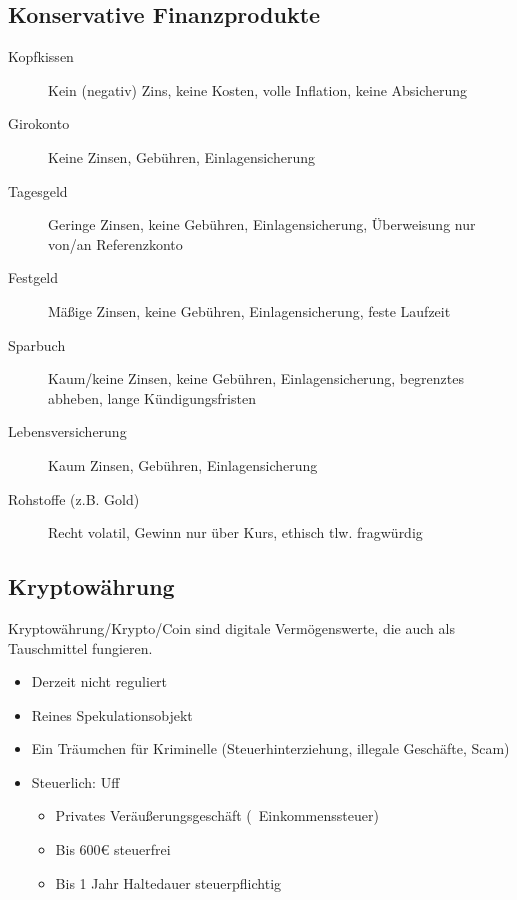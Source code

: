 \documentclass{beamer}
\begin{document}
		\subsection{Konservative Finanzprodukte}
		
			\begin{frame}
				\begin{description}
					\item[Kopfkissen] Kein (negativ) Zins, keine Kosten, volle Inflation, keine Absicherung\pause
					\item[Girokonto] Keine Zinsen, Gebühren, Einlagensicherung\pause
					\item[Tagesgeld] Geringe Zinsen, keine Gebühren, Einlagensicherung, Überweisung nur von/an Referenzkonto\pause
					\item[Festgeld] Mäßige Zinsen, keine Gebühren, Einlagensicherung, feste Laufzeit\pause
					\item[Sparbuch] Kaum/keine Zinsen, keine Gebühren, Einlagensicherung, begrenztes abheben, lange Kündigungsfristen\pause
					\item[Lebensversicherung] Kaum Zinsen, Gebühren, Einlagensicherung\pause
					\item[Rohstoffe (z.B. Gold)] Recht volatil, Gewinn nur über Kurs, ethisch tlw. fragwürdig
				\end{description}
			\end{frame}
		
		\subsection{Kryptowährung}
		
			\begin{frame}
				\begin{definition}
					Kryptowährung/Krypto/Coin sind digitale Vermögenswerte, die auch als Tauschmittel fungieren.\citewiki[Kryptowährung]{Kryptow\%C3\%A4hrung}
				\end{definition}
			
				\begin{itemize}
					\item Derzeit nicht reguliert
					\item Reines Spekulationsobjekt
					\item Ein Träumchen für Kriminelle (Steuerhinterziehung, illegale Geschäfte, Scam)
					\item Steuerlich: Uff
					\begin{itemize}
						\item Privates Veräußerungsgeschäft (\textrightarrow\ Einkommenssteuer)
						\item Bis 600€ steuerfrei
						\item Bis 1 Jahr Haltedauer steuerpflichtig
					\end{itemize}
				\end{itemize}
			\end{frame}
	
\end{document}
